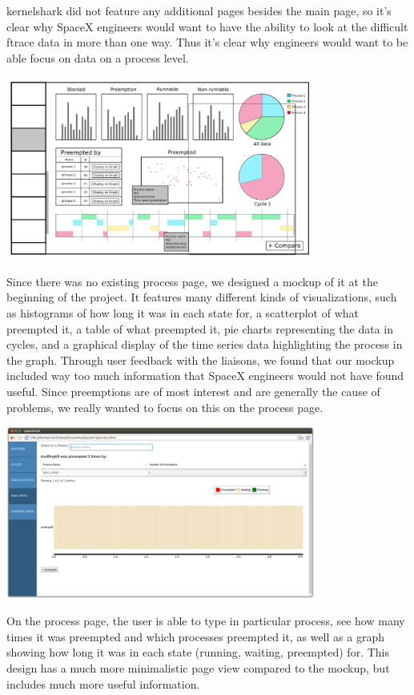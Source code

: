 \documentclass{hmcclinic}
\begin{document}
kernelshark did not feature any additional pages besides the main page, so it's clear why SpaceX engineers would want to have the ability to look at the difficult ftrace data in more than one way. Thus it's clear why engineers would want to be able focus on data on a process level.
\begin{center}
\includegraphics[width=4in]{perProcess-49.png}
\end{center}

Since there was no existing process page, we designed a mockup of it at the beginning of the project. It features many different kinds of visualizations, such as histograms of how long it was in each state for, a scatterplot of what preempted it, a table of what preempted it, pie charts representing the data in cycles, and a graphical display of the time series data highlighting the process in the graph. Through user feedback with the liaisons, we found that our mockup included way too much information that SpaceX engineers would not have found useful. Since preemptions are of most interest and are generally the cause of problems, we really wanted to focus on this on the process page.

\begin{center}
\includegraphics[width=4in]{task-state-page.png}
\end{center}

On the process page, the user is able to type in particular process, see how many times it was preempted and which processes preempted it, as well as a graph showing how long it was in each state (running, waiting, preempted) for. This design has a much more minimalistic page view compared to the mockup, but includes much more useful information.
\end{document}
